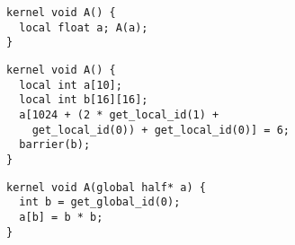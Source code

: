 \newsavebox{\IntelSPIRMetadata}
\begin{lrbox}{\IntelSPIRMetadata}
  \begin{minipage}{\textwidth}
    \begin{verbatim}
kernel void A() {
  local float a; A(a);
}
    \end{verbatim}
  \end{minipage}
\end{lrbox}

\newsavebox{\IntelRemoveDupeBarrier}
\begin{lrbox}{\IntelRemoveDupeBarrier}
  \begin{minipage}{\textwidth}
    \begin{verbatim}
kernel void A() {
  local int a[10];
  local int b[16][16];
  a[1024 + (2 * get_local_id(1) +
    get_local_id(0)) + get_local_id(0)] = 6;
  barrier(b);
}
    \end{verbatim}
  \end{minipage}
\end{lrbox}

\newsavebox{\DagPass}
\begin{lrbox}{\DagPass}
  \begin{minipage}{\textwidth}
    \begin{verbatim}
kernel void A(global half* a) {
  int b = get_global_id(0);
  a[b] = b * b;
}
    \end{verbatim}
  \end{minipage}
\end{lrbox}
